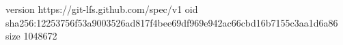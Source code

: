 version https://git-lfs.github.com/spec/v1
oid sha256:12253756f53a9003526ad817f4bee69df969e942ac66cbd16b7155c3aa1d6a86
size 1048672
